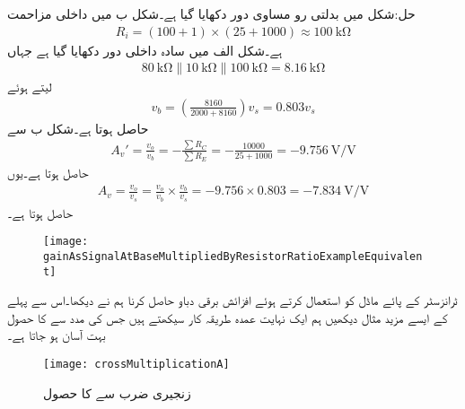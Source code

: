 حل:شکل  میں بدلتی رو مساوی دور دکھایا گیا ہے۔شکل  ب میں داخلی مزاحمت
\begin{align*}
R_i =\left(100+1 \right) \times \left(25+1000 \right) \approx \SI{100}{\kilo \ohm}
\end{align*}
ہے۔شکل  الف   میں سادہ داخلی دور دکھایا گیا ہے  جہاں
\begin{align*}
\SI{80}{\kilo \ohm} \mathbin{\|} \SI{10}{\kilo \ohm} \mathbin{\|} \SI{100}{\kilo \ohm}=\SI{8.16}{\kilo \ohm}
\end{align*}
لیتے ہوئے
\begin{align*}
v_b=\left(\frac{8160}{2000+8160}\right) v_s=0.803 v_s
\end{align*}
حاصل ہوتا ہے۔شکل  ب سے
\begin{align*}
A_v'=\frac{v_o}{v_b}=-\frac{\sum R_C}{\sum R_E}=-\frac{10000}{25+1000}=\SI{-9.756}{\volt \per \volt}
\end{align*} 
حاصل ہوتا ہے۔یوں
\begin{align*}
A_v=\frac{v_o}{v_s}=\frac{v_o}{v_b} \times \frac{v_b}{v_s}=-9.756 \times 0.803=\SI{-7.834}{\volt \per \volt}
\end{align*}
حاصل ہوتا ہے۔
\begin{figure}
\centering
\texttt{[image: gainAsSignalAtBaseMultipliedByResistorRatioExampleEquivalent]}
\caption{}
\label{شکل_ٹرانزسٹر_داخلی_مزاحمت_سے_افزائش_مساوی}
\end{figure}
ٹرانزسٹر کے پائے ماڈل کو استعمال کرتے ہوئے افزائش برقی دباو  حاصل کرنا ہم نے دیکھا۔اس سے پہلے کے ایسے مزید مثال دیکھیں ہم ایک نہایت عمدہ طریقہ کار سیکھتے ہیں جس کی مدد سے  کا حصول بہت آسان ہو جاتا ہے۔
\begin{figure}
\centering
\texttt{[image: crossMultiplicationA]}
\caption{زنجیری ضرب سے  کا حصول}
\label{شکل_زنجیری_ضرب_الف}
\end{figure}

